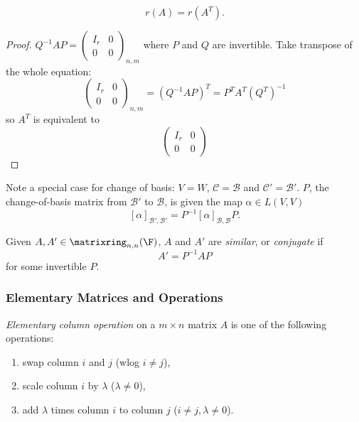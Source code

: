 \documentclass[a4paper]{article}
\newcommand*{\M}{\matrixring}
\newcommand*{\basis}{\mathcal}
\theoremstyle{definition}
\begin{document}
\begin{theorem}
  \label{thm:upper corner matrix}
  \[
    r(A) = r(A^T).
  \]
\end{theorem}

\begin{proof} \(
    Q^{-1}AP =
    \begin{pmatrix}
      I_r & 0 \\
      0 & 0
    \end{pmatrix}_{n,m}
  \) where \(P\) and \(Q\) are invertible. Take transpose of the whole equation:
  \[
    \begin{pmatrix}
      I_r & 0 \\
      0 & 0
    \end{pmatrix}_{n,m}
    =(Q^{-1}AP)^T = P^TA^T(Q^T)^{-1}
  \]
  so \(A^T\) is equivalent to
  \[
      \begin{pmatrix}
      I_r & 0 \\
      0 & 0
    \end{pmatrix}
  \]
\end{proof}

Note a special case for change of basis: \(V = W\), \(\basis C = \basis B\) and \(\basis C' = \basis B'\). \(P\), the change-of-basis matrix from \(\basis B'\) to \(\basis B\), is given the map \(\alpha \in L(V,V)\)
\[
  [\alpha]_{\basis B',\basis B'} = P^{-1}[\alpha]_{\basis B,\basis B}P.
\]

\begin{definition}
  Given \(A, A' \in \M_{n,n}(\F)\), \(A\) and \(A'\) are \emph{similar}, or \emph{conjugate} if
  \[
    A' = P^{-1}AP
  \]
  for some invertible \(P\).
\end{definition}

\subsubsection{Elementary Matrices and Operations}

\begin{definition}
  \emph{Elementary column operation} on a \(m\times n\) matrix \(A\) is one of the following operations:
  \begin{enumerate}
  \item swap column \(i\) and \(j\) (wlog \(i\neq j\)),
  \item scale column \(i\) by \(\lambda\)  (\(\lambda\neq0\)),
  \item add \(\lambda\) times column \(i\) to column \(j\) (\(i\neq j,\lambda\neq 0\)).
  \end{enumerate}
\end{definition}
\end{document}
